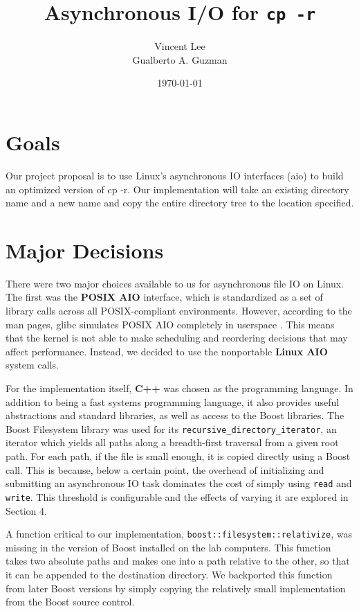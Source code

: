 \documentclass[11pt]{article}
\begin{document}
\title{Asynchronous I/O for \texttt{cp -r}}
\date{\today}
\author{Vincent Lee \\
        Gualberto A. Guzman}

\maketitle

\section{Goals}
Our project proposal is to use Linux's asynchronous IO interfaces (aio) to build an optimized
version of cp -r. Our implementation will take an existing directory name and a new name and
copy the entire directory tree to the location specified.

\section{Major Decisions}
There were two major choices available to us for asynchronous file IO on Linux. The first was the \textbf{POSIX AIO} interface, which is standardized as a set of library calls across all POSIX-compliant environments. However, according to the man pages, glibc simulates POSIX AIO completely in userspace \cite{aio7}. This means that the kernel is not able to make scheduling and reordering decisions that may affect performance. Instead, we decided to use the nonportable \textbf{Linux AIO} system calls.

For the implementation itself, \textbf{C++} was chosen as the programming language. In addition to being a fast systems programming language, it also provides useful abstractions and standard libraries, as well as access to the Boost libraries. The Boost Filesystem library was used for its \texttt{recursive\_directory\_iterator}, an iterator which yields all paths along a breadth-first traversal from a given root path. For each path, if the file is small enough, it is copied directly using a Boost call. This is because, below a certain point, the overhead of initializing and submitting an asynchronous IO task dominates the cost of simply using \texttt{read} and \texttt{write}. This threshold is configurable and the effects of varying it are explored in Section 4.

A function critical to our implementation, \texttt{boost::filesystem::relativize}, was missing in the version of Boost installed on the lab computers. This function takes two absolute paths and makes one into a path relative to the other, so that it can be appended to the destination directory. We backported this function from later Boost versions by simply copying the relatively small implementation from the Boost source control.
\end{document}

